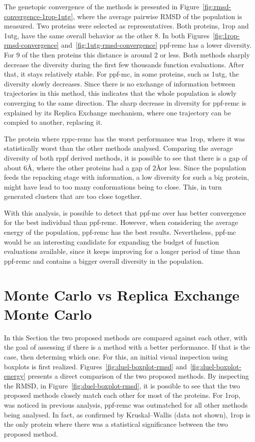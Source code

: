 The genetopic convergence of the methods is presented in
Figure~\ref{fig:rmsd-convergence-1rop-1utg}, where the average pairwise RMSD of
the population is measured. Two proteins were selected as representatives.
Both proteins, 1rop and 1utg, have the same overall behavior as the other 8.
In both Figures~\ref{fig:1rop-rmsd-convergence}
and~\ref{fig:1utg-rmsd-convergence} ppf-remc has a lower diversity. For 9 of
the then proteins this distance is around 2 or less. Both methods sharply
decrease the diversity during the first few thousands function evaluations.
After that, it stays relatively stable. For ppf-mc, in some proteins, such as
1utg, the diversity slowly decreases. Since there is no exchange of information
between trajectories in this method, this indicates that the whole population
is slowly converging to the same direction. The sharp decrease in diversity for
ppf-remc is explained by its Replica Exchange mechanism, where one trajectory
can be compied to another, replacing it.

The protein where rppc-remc has the worst performance was 1rop, where it was
statistically worst than the other methods analysed. Comparing the average
diversity of both rppf derived methods, it is possible to see that there is a
gap of about $6$\AA, where the other proteins had a gap of $2$\AA or less.
Since the population feeds the repacking stage with information, a low diversity
for such a big protein, might have lead to too many conformations being to close.
This, in turn generated clusters that are too close together.

With this analysis, is possible to detect that ppf-mc over has better
convergence for the best individual than ppf-remc. However, when considering
the average energy of the population, ppf-remc has the best results.
Nevertheless, ppf-mc would be an interesting candidate for expanding the
budget of function evaluations available, since it keeps improving for a
longer period of time than ppf-remc and contains a bigger overall diversity in
the population.

\section{Monte Carlo vs Replica Exchange Monte Carlo}
\label{sec:methods-duel}

In this Section the two proposed methods are compared against each other, with
the goal of assessing if there is a method with a better performance. If that is
the case, then determing which one. For this, an initial visual inspection
using boxplots is first realized. Figures~\ref{fig:duel-boxplot-rmsd}
and~\ref{fig:duel-boxplot-energy} presents a direct comparison of the two
proposed methods. By inspecting the RMSD, in Figure~\ref{fig:duel-boxplot-rmsd},
it is possible to see that the two proposed methods closely match each other for
most of the proteins. For 1rop, was noticed in previous analysis, ppf-remc was
outmatched for all other methods being analysed. In fact, as confirmed by
Kruskal–Wallis (data not shown), 1rop is the only protein where there was
a statistical significance between the two proposed method.

